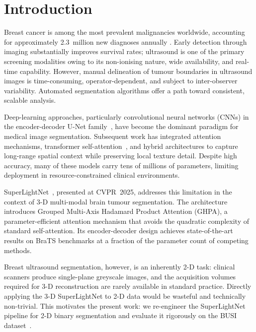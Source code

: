 \documentclass[conference]{IEEEtran}
\begin{document}
\section{Introduction}

Breast cancer is among the most prevalent malignancies worldwide,
accounting for approximately 2.3~million new diagnoses annually
\cite{sung2021global}. Early detection through imaging substantially
improves survival rates; ultrasound is one of the primary screening
modalities owing to its non-ionising nature, wide availability, and
real-time capability. However, manual delineation of tumour boundaries
in ultrasound images is time-consuming, operator-dependent, and subject
to inter-observer variability. Automated segmentation algorithms offer
a path toward consistent, scalable analysis.

Deep-learning approaches, particularly convolutional neural networks
(CNNs) in the encoder-decoder U-Net family~\cite{ronneberger2015u},
have become the dominant paradigm for medical image segmentation.
Subsequent work has integrated attention mechanisms, transformer
self-attention~\cite{chen2021transunet}, and hybrid architectures to
capture long-range spatial context while preserving local texture
detail. Despite high accuracy, many of these models carry tens of
millions of parameters, limiting deployment in resource-constrained
clinical environments.

SuperLightNet~\cite{yu2025superlightnet}, presented at CVPR~2025,
addresses this limitation in the context of 3-D multi-modal brain
tumour segmentation. The architecture introduces Grouped Multi-Axis
Hadamard Product Attention (GHPA), a parameter-efficient attention
mechanism that avoids the quadratic complexity of standard
self-attention. Its encoder-decoder design achieves state-of-the-art
results on BraTS benchmarks at a fraction of the parameter count of
competing methods.

Breast ultrasound segmentation, however, is an inherently 2-D task:
clinical scanners produce single-plane greyscale images, and the
acquisition volumes required for 3-D reconstruction are rarely
available in standard practice. Directly applying the 3-D
SuperLightNet to 2-D data would be wasteful and technically
non-trivial. This motivates the present work: we re-engineer the
SuperLightNet pipeline for 2-D binary segmentation and evaluate it
rigorously on the BUSI dataset~\cite{al2020dataset}.
\end{document}
